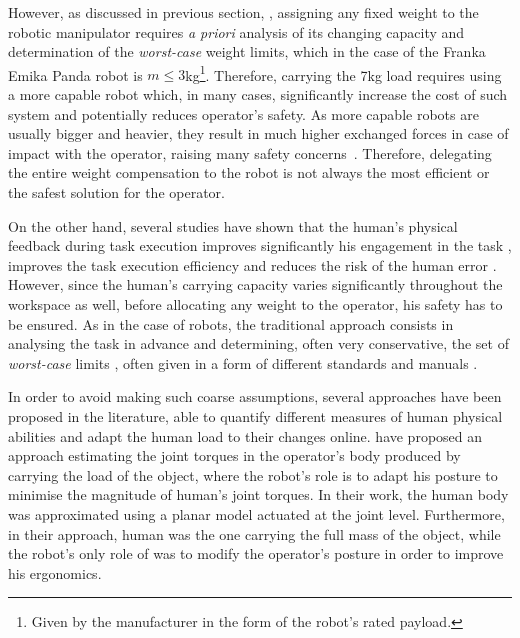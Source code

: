 However, as discussed in previous section, , assigning any fixed weight to the robotic manipulator requires \textit{a priori} analysis of its changing capacity and determination of the \textit{worst-case} weight limits, which in the case of the Franka Emika Panda robot is $m\leq3$kg\footnote{Given by the manufacturer in the form of the robot's rated payload.}. Therefore, carrying the 7kg load requires using a more capable robot which, in many cases, significantly increase the cost of such system and potentially reduces operator's safety. As more capable robots are usually bigger and heavier, they result in much higher exchanged forces in case of impact with the operator, raising many safety concerns~\cite{smu}.
Therefore, delegating the entire weight compensation to the robot is not always the most efficient or the safest solution for the operator. 

On the other hand, several studies have shown that the human's physical feedback during task execution improves significantly his engagement in the task \cite{rani2007operator}, improves the task execution efficiency and reduces the risk of the human error \cite{BYRNE1996249}. However, since the human's carrying capacity varies significantly throughout the workspace as well, before allocating any weight to the operator, his safety has to be ensured. As in the case of robots, the traditional approach consists in analysing the task in advance and determining, often very conservative, the set of \textit{worst-case} limits \cite{shoaf1997comprehensive}, often given in a form of different standards \cite{nasa} and manuals \cite{health1992manual}. 

In order to avoid making such coarse assumptions, several approaches have been proposed in the literature, able to quantify different measures of human physical abilities and adapt the human load to their changes online. \citet{Kim2018} have proposed an approach estimating the joint torques in the operator's body produced by carrying the load of the object, where the robot's role is to adapt his posture to minimise the magnitude of human's joint torques. In their work, the human body was approximated using a planar model actuated at the joint level. Furthermore, in their approach, human was the one carrying the full mass of the object, while the robot's only role of was to modify the operator's posture in order to improve his ergonomics. 

